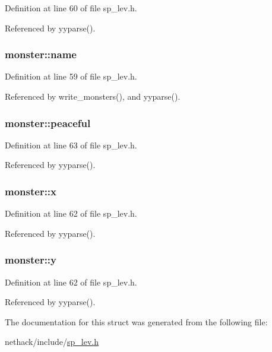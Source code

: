 Definition at line 60 of file sp\+\_\+lev.\+h.



Referenced by yyparse().

\hypertarget{structmonster_aaa15fa26f0d72ddcd172dd3309791e87}{
\subsubsection[{name}]{ monster\+::name}}\label{structmonster_aaa15fa26f0d72ddcd172dd3309791e87}


Definition at line 59 of file sp\+\_\+lev.\+h.



Referenced by write\+\_\+monsters(), and yyparse().

\hypertarget{structmonster_aebb89be3760164c80425bf7d87795809}{
\subsubsection[{peaceful}]{ monster\+::peaceful}}\label{structmonster_aebb89be3760164c80425bf7d87795809}


Definition at line 63 of file sp\+\_\+lev.\+h.



Referenced by yyparse().

\hypertarget{structmonster_a2af2a4a4778c20fadc588e1975548be1}{
\subsubsection[{x}]{ monster\+::x}}\label{structmonster_a2af2a4a4778c20fadc588e1975548be1}


Definition at line 62 of file sp\+\_\+lev.\+h.



Referenced by yyparse().

\hypertarget{structmonster_ab070466d620bc4927de04afaaf9d362b}{
\subsubsection[{y}]{ monster\+::y}}\label{structmonster_ab070466d620bc4927de04afaaf9d362b}


Definition at line 62 of file sp\+\_\+lev.\+h.



Referenced by yyparse().



The documentation for this struct was generated from the following file\+:\begin{DoxyCompactItemize}
\item 
nethack/include/\hyperlink{sp__lev_8h}{sp\+\_\+lev.\+h}\end{DoxyCompactItemize}
